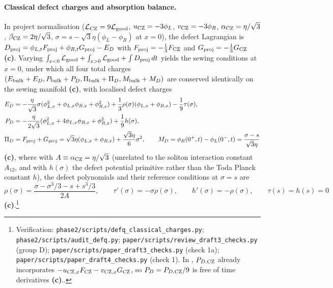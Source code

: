 \documentclass[11pt,a4paper]{article}
\newcommand{\lab}[1]{{\normalfont\sffamily\footnotesize\bfseries(#1)}}
\newcommand{\Lc}{\lab{c}}
\newcommand{\scr}[1]{\nolinkurl{#1}}
\newcommand{\chk}[1]{\footnote{\raggedright Verification: #1.}}
\theoremstyle{remark}
\begin{document}
\paragraph{Classical defect charges and absorption balance.} In project normalisation ($\mathcal L_{\rm CZ}=9\mathcal L_{\rm good}$, $u_{\rm CZ}=-3\phi_L$, $v_{\rm CZ}=-3\phi_R$, $\alpha_{\rm CZ}=\eta/\sqrt3$, $\beta_{\rm CZ}=2\eta/\sqrt3$, $\sigma=s-\sqrt3\eta(\phi_L-\phi_R)$ at $x=0$), the defect Lagrangian is $D_{\rm proj}=\phi_{L,t}F_{\rm proj}+\phi_{R,t}G_{\rm proj}-E_D$ with $F_{\rm proj}=-\tfrac13F_{\rm CZ}$ and $G_{\rm proj}=-\tfrac13G_{\rm CZ}$ \Lc. Varying $\int_{x<0}\mathcal L_{\rm good}+\int_{x>0}\mathcal L_{\rm good}+\int D_{\rm proj}\,dt$ yields the sewing conditions at $x=0$, under which all four total charges $(E_{\rm bulk}+E_D,P_{\rm bulk}+P_D,\Pi_{\rm bulk}+\Pi_D,M_{\rm bulk}+M_D)$ are conserved identically on the sewing manifold \Lc, with localised defect charges
\begin{equation}\label{eq:defcharges}
\begin{aligned}
E_D&=-\frac{\eta}{\sqrt3}\sigma(\phi_{L,x}^2+\phi_{L,x}\phi_{R,x}+\phi_{R,x}^2)+\frac13\rho(\sigma)(\phi_{L,x}+\phi_{R,x})-\frac19\tau(\sigma),\\
P_D&=-\frac{\eta}{2\sqrt3}(\phi_{L,x}^2+4\phi_{L,x}\phi_{R,x}+\phi_{R,x}^2)+\frac19h(\sigma),\\
\Pi_D&=F_{\rm proj}+G_{\rm proj}=\sqrt3\eta(\phi_{L,x}+\phi_{R,x})+\frac{\sqrt3\eta}6\sigma^2,\qquad
M_D=\phi_R(0^+,t)-\phi_L(0^-,t)=\frac{\sigma-s}{\sqrt3\eta}
\end{aligned}
\end{equation}
\Lc, where with $A\equiv\alpha_{\rm CZ}=\eta/\sqrt3$ (unrelated to the soliton interaction constant $A_{12}$, and with $h(\sigma)$ the defect potential primitive rather than the Toda Planck constant $h$), the defect polynomials and their reference conditions at $\sigma=s$ are
\begin{equation}\label{eq:defprims}
\rho(\sigma)=\frac{\sigma-\sigma^3/3-s+s^3/3}{2A},\qquad
\tau'(\sigma)=-\sigma\rho(\sigma),\qquad
h'(\sigma)=-\rho(\sigma),\qquad
\tau(s)=h(s)=0
\end{equation}
\Lc.\chk{\scr{phase2/scripts/defq_classical_charges.py}; \scr{phase2/scripts/audit_defq.py}; \scr{paper/scripts/review_draft3_checks.py} (group D); \scr{paper/scripts/paper_draft3_checks.py} (check 1a); \scr{paper/scripts/paper_draft4_checks.py} (check 1). In \cite[(3.49)]{CZ}, $P_{D,{\rm CZ}}$ already incorporates $-u_{{\rm CZ},x}F_{\rm CZ}-v_{{\rm CZ},x}G_{\rm CZ}$, so $P_D=P_{D,{\rm CZ}}/9$ is free of time derivatives \Lc.}
\end{document}
